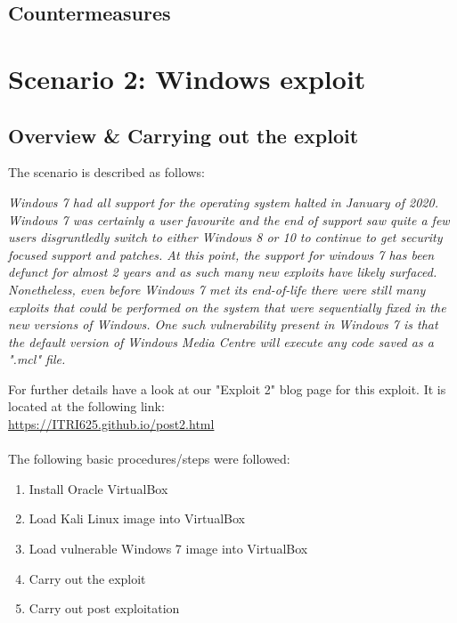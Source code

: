 \documentclass[a4paper, 12pt, titlepage]{report}
\begin{document}
\section{Countermeasures}
\chapter{Scenario 2: Windows exploit}
\section{Overview \& Carrying out the exploit}
The scenario is described as follows:
\begin{displayquote}
\textit{Windows 7 had all support for the operating system halted in January of 2020. Windows 7 was certainly a user favourite and the end of support saw quite a few users disgruntledly switch to either Windows 8 or 10 to continue to get security focused support and patches. At this point, the support for windows 7 has been defunct for almost 2 years and as such many new exploits have likely surfaced. Nonetheless, even before Windows 7 met its end-of-life there were still many exploits that could be performed on the system that were sequentially fixed in the new versions of Windows. One such vulnerability present in Windows 7 is that the default version of Windows Media Centre will execute any code saved as a ".mcl" file.}
\end{displayquote}
For further details have a look at our "Exploit 2" blog page for this exploit. It is located at the following link:\\
\url{https://ITRI625.github.io/post2.html}
\\\\
The following basic procedures/steps were followed:
\begin{enumerate}
    \item Install Oracle VirtualBox
    \item Load Kali Linux image into VirtualBox
    \item Load vulnerable Windows 7 image into VirtualBox
    \item Carry out the exploit
    \item Carry out post exploitation
\end{enumerate}
\end{document}

